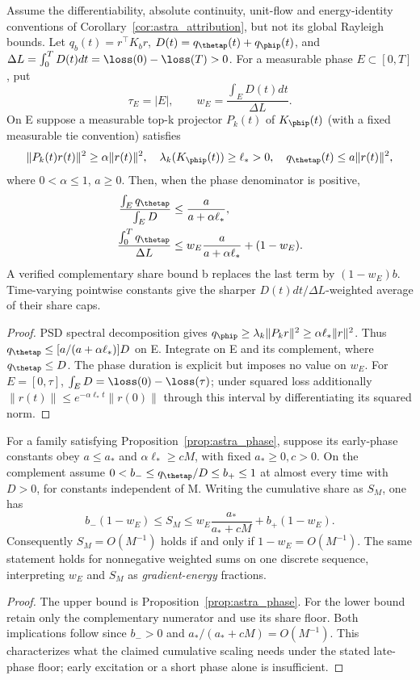 \begin{proposition}
\label{prop:astra_phase}
Assume the differentiability, absolute continuity, unit-flow and
energy-identity conventions of Corollary~\ref{cor:astra_attribution},
but not its global Rayleigh bounds. Let
$q_b(t)=r^\top K_br$, $D(t)=q_\thetap(t)+q_\phip(t)$, and
$\Delta L=\int_0^TD(t)dt=\loss(0)-\loss(T)>0$.
For a measurable phase $E\subset[0,T]$, put
\[
 \tau_E=|E|,\qquad w_E=\frac{\int_E D(t)dt}{\Delta L}.
\]
On E suppose a measurable top-k projector $P_k(t)$ of $K_\phip(t)$
(with a fixed measurable tie convention) satisfies
\[
 \|P_k(t)r(t)\|^2\ge\alpha\|r(t)\|^2,\quad
 \lambda_k(K_\phip(t))\ge\ell_*>0,\quad
 q_\thetap(t)\le a\|r(t)\|^2,
\]
where $0<\alpha\le1$, $a\ge0$. Then, when the phase denominator is positive,
\begin{align}
 \frac{\int_E q_\thetap}{\int_E D}&\le\frac{a}{a+\alpha\ell_*},
 \label{eq:astra_phase}\\
 \frac{\int_0^Tq_\thetap}{\Delta L}
 &\le w_E\frac{a}{a+\alpha\ell_*}+(1-w_E).
 \label{eq:astra_phase_total}
\end{align}
A verified complementary share bound b replaces the last term by
$(1-w_E)b$. Time-varying pointwise constants give the sharper
$D(t)dt/\Delta L$-weighted average of their share caps.
\end{proposition}
\begin{proof}
PSD spectral decomposition gives
$q_\phip\ge\lambda_k\|P_kr\|^2\ge\alpha\ell_*\|r\|^2$.
Thus $q_\thetap\le[a/(a+\alpha\ell_*)]D$ on E.
Integrate on E and its complement, where $q_\thetap\le D$.
The phase duration is explicit but imposes no value on $w_E$.
For $E=[0,\tau]$, $\int_E D=\loss(0)-\loss(\tau)$; under squared
loss additionally $\|r(t)\|\le e^{-\alpha\ell_*t}\|r(0)\|$
through this interval by differentiating its squared norm.
\end{proof}
\begin{corollary}
\label{cor:astra_phase_width}
For a family satisfying Proposition~\ref{prop:astra_phase}, suppose
its early-phase constants obey $a\le a_*$ and
$\alpha\ell_*\ge cM$, with fixed $a_*\ge0,c>0$. On the complement
assume $0<b_-\le q_\thetap/D\le b_+\le1$ at almost every time with
$D>0$, for constants independent of M. Writing the cumulative share
as $S_M$, one has
\[
 b_-(1-w_E)\le S_M
 \le w_E\frac{a_*}{a_*+cM}+b_+(1-w_E).
\]
Consequently $S_M=O(M^{-1})$ holds if and only if
$1-w_E=O(M^{-1})$. The same statement holds for nonnegative weighted
sums on one discrete sequence, interpreting $w_E$ and $S_M$ as
\emph{gradient-energy} fractions.
\end{corollary}
\begin{proof}
The upper bound is Proposition~\ref{prop:astra_phase}. For the lower
bound retain only the complementary numerator and use its share floor.
Both implications follow since $b_->0$ and $a_*/(a_*+cM)=O(M^{-1})$.
This characterizes what the claimed cumulative scaling needs under the
stated late-phase floor; early excitation or a short phase alone is insufficient.
\end{proof}

